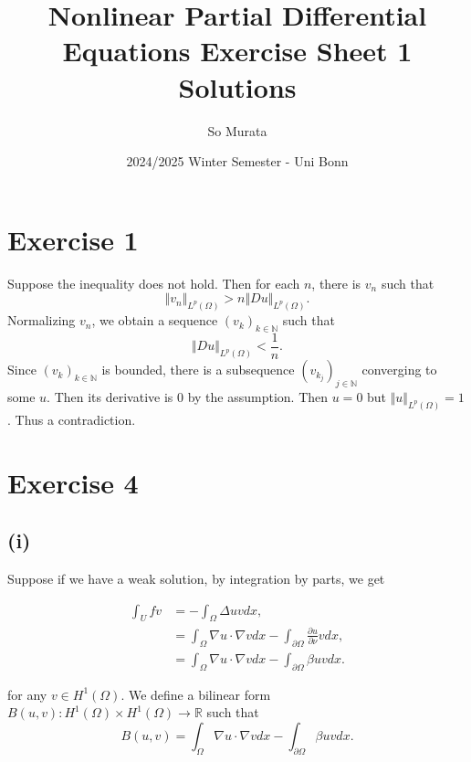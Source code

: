 \documentclass{article}
\title{Nonlinear Partial Differential Equations Exercise Sheet 1 Solutions}
\author{So Murata}
\date{2024/2025 Winter Semester - Uni Bonn}
\begin{document}
\maketitle
\section*{Exercise 1}

Suppose the inequality does not hold. Then for each $n$, there is $v_n$ such that
\begin{equation*}
\Vert v_n\Vert_{L^p(\Omega)} > n\Vert Du\Vert_{L^p(\Omega)}.
\end{equation*}
Normalizing $v_n$, we obtain a sequence $(v_k)_{k\in\mathbb{N}}$ such that
\begin{equation*}
\Vert Du\Vert_{L^p(\Omega)} < {\frac 1 n}.
\end{equation*}
Since $(v_k)_{k\in\mathbb{N}}$ is bounded, there is a subsequence $(v_{k_j})_{j\in\mathbb{N}}$ converging to some $u$. Then its derivative is $0$ by the assumption. Then $u=0$ but $\Vert u\Vert_{L^p(\Omega)}=1$. Thus a contradiction.

\section*{Exercise 4}

\subsection*{(i)}

Suppose if we have a weak solution, by integration by parts, we get

\begin{align*}
\int_U fv &=-\int_\Omega \Delta uvdx,\\
& =  \int_{\Omega}\nabla u\cdot\nabla vdx-\int_{\partial\Omega}{\frac {\partial u} {\partial \nu}}vdx ,\\
&= \int_{\Omega}\nabla u\cdot\nabla vdx-\int_{\partial\Omega}\beta uvdx .
\end{align*}

for any $v\in H^1(\Omega)$. We define a bilinear form $B(u,v):H^1(\Omega)\times H^1(\Omega)\to\mathbb{R}$ such that
\begin{equation*}
B(u,v) =  \int_{\Omega}\nabla u\cdot\nabla vdx-\int_{\partial\Omega}\beta uvdx.
\end{equation*}
\end{document}
